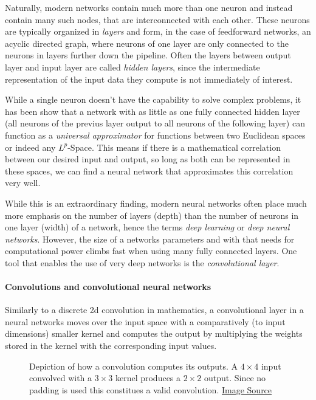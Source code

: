 Naturally, modern networks contain much more than one neuron and instead contain many such nodes, that are interconnected with each other. 
These neurons are typically organized in \emph{layers} and form, in the case of feedforward networks, an acyclic directed graph, where neurons of one layer are only connected to the neurons in layers further down the pipeline. Often the layers between output layer and input layer are called \emph{hidden layers}, since the intermediate representation of the input data they compute is not immediately of interest.

While a single neuron doesn't have the capability to solve complex problems, it has been show that a network with as little as one fully connected hidden layer (all neurons of the previus layer output to all neurons of the following layer) can function as a \emph{universal approximator} for functions between two Euclidean spaces\cite{hornikMultilayerFeedforwardNetworks1989} or indeed any $L^p$-Space\cite{parkMinimumWidthUniversal2020}. This means if there is a mathematical correlation between our desired input and output, so long as both can be represented in these spaces, we can find a neural network that approximates this correlation very well.

While this is an extraordinary finding, modern neural networks often place much more emphasis on the number of layers (depth) than the number of neurons in one layer (width) of a network, hence the terms \emph{deep learning} or \emph{deep neural networks}. However, the size of a networks parameters and with that needs for computational power climbs fast when using many fully connected layers. One tool that enables the use of very deep networks is the \emph{convolutional layer}.

\paragraph*{Convolutions and convolutional neural networks}

Similarly to a discrete 2d convolution in mathematics, a convolutional layer in a neural networks moves over the input space with a comparatively (to input dimensions) smaller kernel and computes the output by multiplying the weights stored in the kernel with the corresponding input values.

\begin{figure}[htbp]
    \caption{Depiction of how a convolution computes its outputs. A $4\times 4$ input convolved with a $3\times 3$ kernel produces a $2\times 2$ output. Since no padding is used this constitues a valid convolution. \href{https://fastai.github.io/fastbook2e/images/att_00028.png}{Image Source}}
    \label{fig:convolution}
\end{figure}

